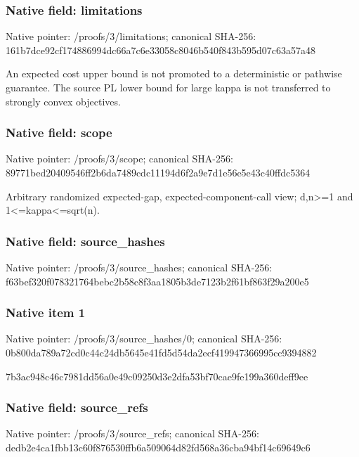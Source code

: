 \documentclass[10pt,a4paper]{article}
\begin{document}
\subsubsection{Native field: limitations}
Native pointer: /proofs/3/limitations; canonical SHA-256: 161b7dce92cf174886994dc66a7c6e33058c8046b540f843b595d07c63a57a48

\begingroup\raggedright\sloppy An expected cost upper bound is not promoted to a deterministic or pathwise guarantee. The source PL lower bound for large kappa is not transferred to strongly convex objectives.\par\endgroup

\subsubsection{Native field: scope}
Native pointer: /proofs/3/scope; canonical SHA-256: 89771bed20409546ff2b6da7489cdc11194d6f2a9e7d1e56e5e43c40ffdc5364

\begingroup\raggedright\sloppy Arbitrary randomized expected-gap,\allowbreak{} expected-component-call view;\allowbreak{} d,\allowbreak{}n>=\allowbreak{}1 and 1<=\allowbreak{}kappa<=\allowbreak{}sqrt(n).\par\endgroup

\subsubsection{Native field: source\_\allowbreak{}hashes}
Native pointer: /proofs/3/source\_\allowbreak{}hashes; canonical SHA-256: f63bef320f078321764bebc2b58c8f3aa1805b3de7123b2f61bf863f29a200e5

\subsubsection{Native item 1}
Native pointer: /proofs/3/source\_\allowbreak{}hashes/0; canonical SHA-256: 0b800da789a72cd0c44c24db5645e41fd5d54da2ecf419947366995cc9394882

\begingroup\raggedright\sloppy 7b3ac948c46c7981dd56a0e49c09250d3e2dfa53bf70cae9fe199a360deff9ee\par\endgroup

\subsubsection{Native field: source\_\allowbreak{}refs}
Native pointer: /proofs/3/source\_\allowbreak{}refs; canonical SHA-256: dedb2e4ca1fbb13c60f876530ffb6a509064d82fd568a36cba94bf14c69649c6
\end{document}
